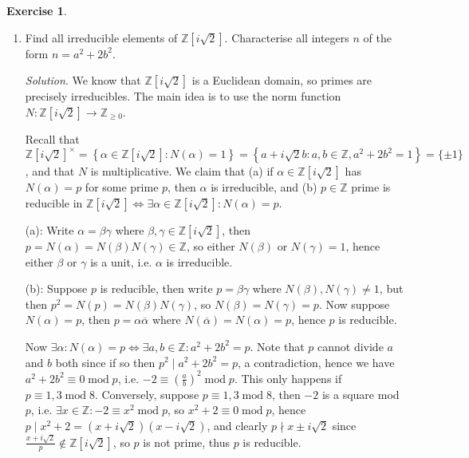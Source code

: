 \documentclass{article}
\newcommand{\Z}{\mathbb{Z}}
\newcommand{\Mod}{\operatorname{mod}}
\theoremstyle{definition}
\newtheorem{exe}[defn]{Exercise}
\begin{document}
\begin{exe}
\begin{enumerate}
\item Find all irreducible elements of $\Z\left[i\sqrt 2\right]$. Characterise all integers $n$ of the form $n=a^2+2b^2$.

\textit{Solution}. We know that $\Z\left[i\sqrt 2\right]$ is a Euclidean domain, so primes are precisely irreducibles. The main idea is to use the norm function $N:\Z\left[i\sqrt 2\right]\rightarrow\Z_{\geq 0}$.

Recall that $\Z\left[i\sqrt 2\right]^\times=\left\{\alpha\in\Z\left[i\sqrt 2\right]:N(\alpha)=1\right\}=\left\{a+i\sqrt 2 b:a,b\in\Z,a^2+2b^2=1\right\}=\{\pm 1\}$, and that $N$ is multiplicative. We claim that (a) if $\alpha\in\Z\left[i\sqrt 2\right]$ has $N(\alpha)=p$ for some prime $p$, then $\alpha$ is irreducible, and (b) $p\in\Z$ prime is reducible in $\Z\left[i\sqrt 2\right]\iff\exists\alpha\in\Z\left[i\sqrt 2\right]:N(\alpha)=p$.

(a): Write $\alpha=\beta\gamma$ where $\beta,\gamma\in\Z\left[i\sqrt 2\right]$, then $p=N(\alpha)=N(\beta)N(\gamma)\in\Z$, so either $N(\beta)$ or $N(\gamma)=1$, hence either $\beta$ or $\gamma$ is a unit, i.e. $\alpha$ is irreducible.

(b): Suppose $p$ is reducible, then write $p=\beta\gamma$ where $N(\beta),N(\gamma)\neq 1$, but then $p^2=N(p)=N(\beta)N(\gamma)$, so $N(\beta)=N(\gamma)=p$. Now suppose $N(\alpha)=p$, then $p=\alpha\overline{\alpha}$ where $N(\overline\alpha)=N(\alpha)=p$, hence $p$ is reducible.

Now $\exists\alpha:N(\alpha)=p\iff\exists a,b\in\Z:a^2+2b^2=p$. Note that $p$ cannot divide $a$ and $b$ both since if so then $p^2\mid a^2+2b^2=p$, a contradiction, hence we have $a^2+2b^2\equiv 0\Mod p$, i.e. $-2\equiv \left(\frac{a}{b}\right)^2\Mod p$. This only happens if $p\equiv 1,3\Mod 8$. Conversely, suppose $p\equiv 1,3\Mod 8$, then $-2$ is a square mod $p$, i.e. $\exists x\in\Z:-2\equiv x^2\Mod p$, so $x^2+2\equiv 0\Mod p$, hence $p\mid x^2+2=\left(x+i\sqrt 2\right)\left(x-i\sqrt 2\right)$, and clearly $p\nmid x\pm i\sqrt 2$ since $\frac{x+i\sqrt 2}{p}\notin\Z\left[i\sqrt 2\right]$, so $p$ is not prime, thus $p$ is reducible.


\end{enumerate}
\end{exe}
\end{document}
